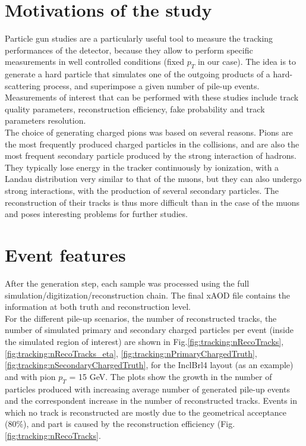 \documentclass[a4paper,twoside,12pt]{book}
\begin{document}
\section{Motivations of the study}
Particle gun studies are a particularly useful tool to measure the tracking performances of the detector, because they allow to perform
specific measurements in well controlled conditions (fixed $p_{T}$ in our case). The idea is to generate a hard particle that
simulates one of the outgoing products of a hard-scattering process, and superimpose a given number of pile-up events. Measurements of interest that can be performed 
with these studies include track quality parameters, reconstruction efficiency, fake probability and track parameters resolution.\\

The choice of generating charged pions was based on several reasons. Pions are the most frequently
produced charged particles in the collisions, and are also the most frequent secondary particle produced by the strong interaction of hadrons. They typically lose energy in the tracker continuously by ionization, with a Landau distribution very similar to that of the muons, but they can also undergo strong interactions, with the production of several secondary particles. The reconstruction of their tracks
is thus more difficult than in the case of the muons and poses interesting problems for further studies.

\section{Event features}\label{subsec:tracking:eventFeatures}
After the generation step, each sample was processed using the full simulation/digitization/reconstruction chain. The final xAOD file contains the information at both
truth and reconstruction level. \\

For the different pile-up scenarios, the number of reconstructed tracks, the number of simulated primary and secondary charged particles per event
(inside the simulated region of interest) are shown in Fig.\ref{fig:tracking:nRecoTracks},
\ref{fig:tracking:nRecoTracks_eta}, \ref{fig:tracking:nPrimaryChargedTruth}, \ref{fig:tracking:nSecondaryChargedTruth},  for the InclBrl4 layout (as an example) and with pion $p_{T}$ = 15 GeV. The plots show the growth in the number of particles produced with increasing average number of generated pile-up events and
the correspondent increase in the number of reconstructed tracks. Events in which no track is reconstructed are mostly due to the geometrical acceptance (80\%), and part is caused by the reconstruction efficiency (Fig.\ref{fig:tracking:nRecoTracks}.\\
\end{document}
